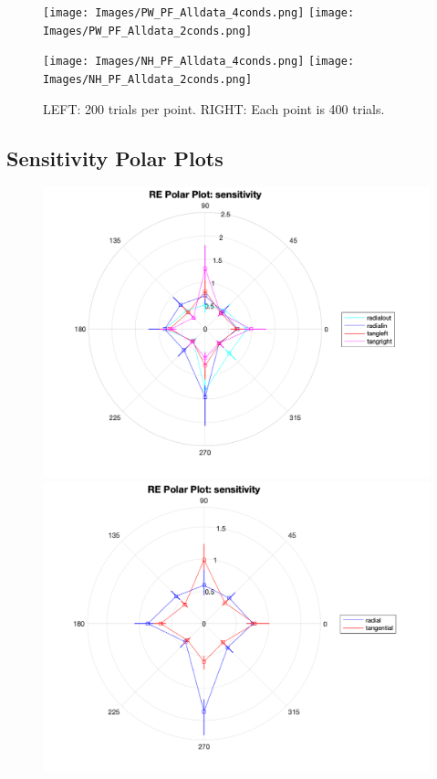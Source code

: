 \documentclass[11pt]{article} %
\begin{document}
\begin{figure}[H]
\centering %
\texttt{[image: Images/PW\_PF\_Alldata\_4conds.png]}
\texttt{[image: Images/PW\_PF\_Alldata\_2conds.png]}
\end{figure}
\begin{figure}[H]
\centering %
\texttt{[image: Images/NH\_PF\_Alldata\_4conds.png]}
\texttt{[image: Images/NH\_PF\_Alldata\_2conds.png]}
\caption{LEFT: 200 trials per point. RIGHT: Each point is 400 trials.}
\end{figure}

\newpage
\subsection{Sensitivity Polar Plots}
\begin{figure}[H]
\centering %
\includegraphics[scale=.3]{Images/RE_PP_sensitivity_Alldata_4conds.png}
\includegraphics[scale=.3]{Images/RE_PP_sensitivity_Alldata_2conds.png}
\end{figure}
\end{document}
